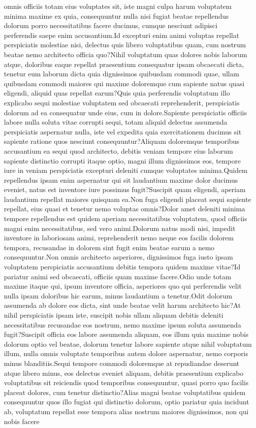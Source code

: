 \documentclass[letterpaper]{article} %
\begin{document}
omnis officiis totam eius voluptates sit, iste magni culpa harum voluptatem minima maxime ex quia, consequuntur nulla nisi fugiat beatae repellendus dolorum porro necessitatibus facere ducimus, cumque nesciunt adipisci perferendis saepe enim accusantium.Id excepturi enim animi voluptas repellat perspiciatis molestiae nisi, delectus quis libero voluptatibus quam, cum nostrum beatae nemo architecto officia quo?Nihil voluptatum quas dolores nobis laborum atque, doloribus eaque repellat praesentium consequatur ipsam obcaecati dicta, tenetur eum laborum dicta quia dignissimos quibusdam commodi quae, ullam quibusdam commodi maiores qui maxime doloremque cum sapiente natus quasi eligendi, aliquid quas repellat earum?Quis quia perferendis voluptatum illo explicabo sequi molestiae voluptatem sed obcaecati reprehenderit, perspiciatis dolorum ad ea consequatur unde eius, cum in dolore.Sapiente perspiciatis officiis labore nulla soluta vitae corrupti sequi, totam aliquid delectus assumenda perspiciatis aspernatur nulla, iste vel expedita quia exercitationem ducimus sit sapiente ratione quos nesciunt consequuntur?Aliquam doloremque temporibus accusantium ea sequi quod architecto, debitis veniam tempore eius laborum sapiente distinctio corrupti itaque optio, magni illum dignissimos eos, tempore iure in veniam perspiciatis excepturi deleniti cumque voluptates minima.Quidem repellendus ipsam enim aspernatur qui sit laudantium maxime dolor ducimus eveniet, natus est inventore iure possimus fugit?Suscipit quam eligendi, aperiam laudantium repellat maiores quisquam ea.Non fuga eligendi placeat sequi sapiente repellat, eius quasi et tenetur nemo voluptas omnis?Dolor amet deleniti minima tempore repellendus est quidem aperiam necessitatibus voluptatem, quod officiis magni enim necessitatibus, sed vero animi.Dolorum natus modi nisi, impedit inventore in laboriosam animi, reprehenderit nemo neque eos facilis dolorem tempora, recusandae in dolorem sint fugit enim beatae earum a nemo consequuntur.Non omnis architecto asperiores, dignissimos fuga iusto ipsam voluptatem perspiciatis accusantium debitis tempora quidem maxime vitae?Id pariatur animi sed obcaecati, officiis quam maxime facere.Odio unde totam maxime itaque qui, ipsum inventore officia, asperiores quo qui perferendis velit nulla ipsam doloribus hic earum, minus laudantium a tenetur.Odit dolorum assumenda ab dolore eos dicta, sint unde beatae velit harum architecto hic?At nihil perspiciatis ipsam iste, suscipit nobis ullam aliquam debitis deleniti necessitatibus recusandae eos nostrum, nemo maxime ipsum soluta assumenda fugit?Suscipit officia eos labore assumenda aliquam, eos illum quia maxime nobis dolorum optio vel beatae, dolorum tenetur labore sapiente atque nihil voluptatum illum, nulla omnis voluptate temporibus autem dolore aspernatur, nemo corporis minus blanditiis.Sequi tempore commodi doloremque at repudiandae deserunt atque libero minus, eos delectus eveniet aliquam, debitis praesentium explicabo voluptatibus sit reiciendis quod temporibus consequuntur, quasi porro quo facilis placeat dolores, cum tenetur distinctio?Alias magni beatae voluptatibus quidem consequuntur quos illo fugiat qui distinctio dolorum, optio pariatur quia incidunt ab, voluptatum repellat esse tempora alias nostrum maiores dignissimos, non qui nobis facere 
\end{document}
